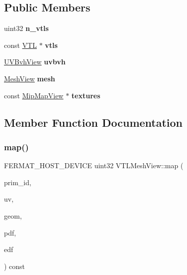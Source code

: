 \subsection*{Public Members}
\begin{DoxyCompactItemize}
\item 
\mbox{\label{struct_v_t_l_mesh_view_ad66e4d4d081cfe85027968780c9d56ea}} 
uint32 {\bfseries n\+\_\+vtls}
\item 
\mbox{\label{struct_v_t_l_mesh_view_a7de93e0b8c5c1e3e688e5995a6a493a5}} 
const \hyperlink{struct_v_t_l}{V\+TL} $\ast$ {\bfseries vtls}
\item 
\mbox{\label{struct_v_t_l_mesh_view_a65c96b430b46f285cab1d8698851ad99}} 
\hyperlink{struct_u_v_bvh_view}{U\+V\+Bvh\+View} {\bfseries uvbvh}
\item 
\mbox{\label{struct_v_t_l_mesh_view_a185f8589a1210e404d24cd3ace967746}} 
\hyperlink{struct_mesh_view}{Mesh\+View} {\bfseries mesh}
\item 
\mbox{\label{struct_v_t_l_mesh_view_ab17d8b007a506bd236c2e0bf996e086d}} 
const \hyperlink{struct_mip_map_view}{Mip\+Map\+View} $\ast$ {\bfseries textures}
\end{DoxyCompactItemize}


\subsection{Member Function Documentation}
\mbox{\label{struct_v_t_l_mesh_view_a74c81f6a7fb7eca25c7f1a2584ec595d}} 
\subsubsection{\texorpdfstring{map()}{map()}}
{\footnotesize\ttfamily F\+E\+R\+M\+A\+T\+\_\+\+H\+O\+S\+T\+\_\+\+D\+E\+V\+I\+CE uint32 V\+T\+L\+Mesh\+View\+::map (\begin{DoxyParamCaption}\item[{const uint32\+\_\+t}]{prim\+\_\+id,  }\item[{const \hyperlink{structcugar_1_1_vector}{cugar\+::\+Vector2f} \&}]{uv,  }\item[{const \hyperlink{struct_vertex_geometry}{Vertex\+Geometry} \&}]{geom,  }\item[{float $\ast$}]{pdf,  }\item[{\hyperlink{struct_edf}{Edf} $\ast$}]{edf }\end{DoxyParamCaption}) const\hspace{0.3cm}{\ttfamily [inline]}}


